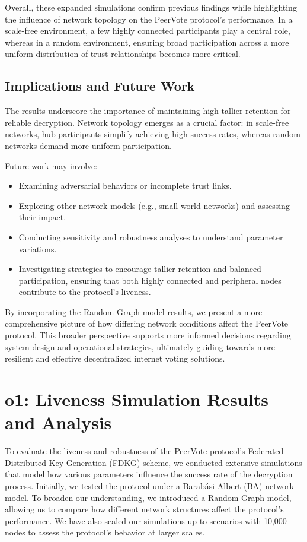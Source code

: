 \documentclass[runningheads]{llncs}
\begin{document}
Overall, these expanded simulations confirm previous findings while highlighting the influence of network topology on the PeerVote protocol’s performance. In a scale-free environment, a few highly connected participants play a central role, whereas in a random environment, ensuring broad participation across a more uniform distribution of trust relationships becomes more critical.

\subsection{Implications and Future Work}

The results underscore the importance of maintaining high tallier retention for reliable decryption. Network topology emerges as a crucial factor: in scale-free networks, hub participants simplify achieving high success rates, whereas random networks demand more uniform participation.

Future work may involve:

\begin{itemize}
    \item Examining adversarial behaviors or incomplete trust links.
    \item Exploring other network models (e.g., small-world networks) and assessing their impact.
    \item Conducting sensitivity and robustness analyses to understand parameter variations.
    \item Investigating strategies to encourage tallier retention and balanced participation, ensuring that both highly connected and peripheral nodes contribute to the protocol’s liveness.
\end{itemize}

By incorporating the Random Graph model results, we present a more comprehensive picture of how differing network conditions affect the PeerVote protocol. This broader perspective supports more informed decisions regarding system design and operational strategies, ultimately guiding towards more resilient and effective decentralized internet voting solutions.



\section{o1: Liveness Simulation Results and Analysis}
\label{sec:extended-results-o1}

To evaluate the liveness and robustness of the PeerVote protocol's Federated Distributed Key Generation (FDKG) scheme, we conducted extensive simulations that model how various parameters influence the success rate of the decryption process. Initially, we tested the protocol under a Barabási-Albert (BA) network model. To broaden our understanding, we introduced a Random Graph model, allowing us to compare how different network structures affect the protocol's performance. We have also scaled our simulations up to scenarios with 10,000 nodes to assess the protocol’s behavior at larger scales.
\end{document}
